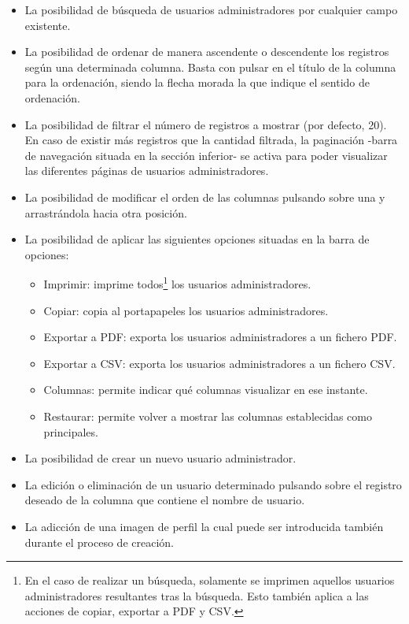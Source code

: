 \documentclass[12pt,a4paper, twoside]{report}
\begin{document}
\begin{itemize}
\begin{itemize}
			\item La posibilidad de búsqueda de usuarios administradores por cualquier campo existente.
		 	\item La posibilidad de ordenar de manera ascendente o descendente los registros según una determinada columna. Basta con pulsar en el título de la columna para la ordenación, siendo la flecha morada la que indique el sentido de ordenación.
			\item La posibilidad de filtrar el número de registros a mostrar (por defecto, 20). En caso de existir más registros que la cantidad filtrada, la paginación -barra de navegación situada en la sección inferior- se activa para poder visualizar las diferentes páginas de usuarios administradores.
			\item La posibilidad de modificar el orden de las columnas pulsando sobre una y arrastrándola hacia otra posición. 
			\item La posibilidad de aplicar las siguientes opciones situadas en la barra de opciones:
				\begin{itemize}
					\item Imprimir: imprime todos\footnote{En el caso de realizar un búsqueda, solamente se imprimen aquellos usuarios administradores resultantes tras la búsqueda. Esto también aplica a las acciones de copiar, exportar a PDF y CSV.} los usuarios administradores.
					\item Copiar: copia al portapapeles los usuarios administradores.
					\item Exportar a PDF: exporta los usuarios administradores a un fichero PDF.
					\item Exportar a CSV: exporta los usuarios administradores a un fichero CSV.
					\item Columnas: permite indicar qué columnas visualizar en ese instante.
					\item Restaurar: permite volver a mostrar las columnas establecidas como principales.
				\end{itemize}
			\item La posibilidad de crear un nuevo usuario administrador.
			\item La edición o eliminación de un usuario determinado pulsando sobre el registro deseado de la columna que contiene el nombre de usuario.
			\item La adicción de una imagen de perfil la cual puede ser introducida también durante el proceso de creación.
		\end{itemize}
		

\end{itemize}
\end{document}
